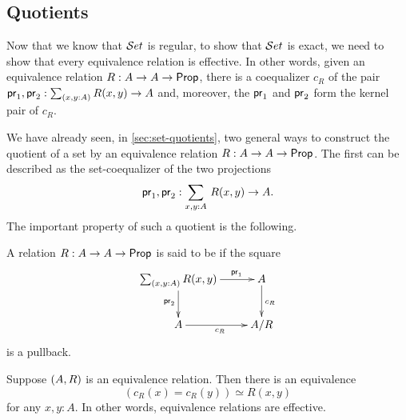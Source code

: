 \subsection{Quotients}\label{subsec:quotients}
Now that we know that $\mathcal{S}et$ is regular, to show that $\mathcal{S}et$ is exact, we need to show that every
equivalence relation is effective. In other words, given an equivalence
relation $R:A\to A\to\mathsf{Prop}$, there is a coequalizer $c_R$ of the pair
$\proj1,\proj2:\sm{x,y:A} R(x,y)\to A$ and, moreover, the $\mathsf{pr}_{1}$ and $\mathsf{pr}_{2}$
form the kernel pair of $c_R$.

We have already seen, in \autoref{sec:set-quotients}, two general ways to construct the quotient of a set by an equivalence relation $R:A\to A\to\mathsf{Prop}$.
The first can be described as the set-coequalizer of the two projections
\[\proj1,\proj2:\sm{x,y:A} R(x,y)\to A.\]
The important property of such a quotient is the following.

\begin{defn}
A relation $R:A\to A\to\mathsf{Prop}$ is said to be  if the square
\begin{equation*}
  \xymatrix{
    {\sm{x,y:A} R (x,y)}
    \ar[r]^(0.7){\proj1}
    \ar[d]_{\proj2}
    &
    {A}
    \ar[d]^{c_R}
    \\
    {A}
    \ar[r]_{c_R}
    &
    {A/R}
    }
\end{equation*}
is a pullback. 
\end{defn}

\begin{lem}\label{lem:sets_exact}
Suppose ${(A,R)}$ is an equivalence relation. Then there is an equivalence
\begin{equation*}
(c_R(x)= c_R(y))\simeq R(x,y)
\end{equation*}
for any $x,y:A$. In other words, equivalence relations are effective.
\end{lem}

